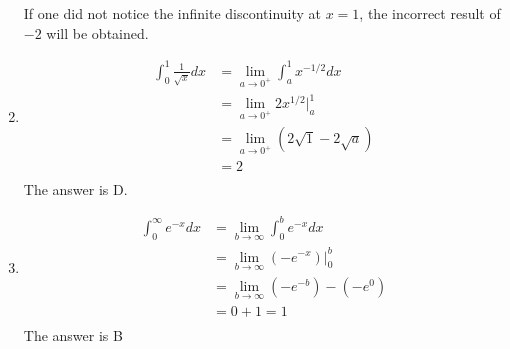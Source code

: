 \documentclass{article}
\begin{document}
\begin{enumerate}
    If one did not notice the infinite discontinuity at $x=1$, the incorrect result of $-2$ will be obtained.

    \item 
    \begin{align*}
        \int_{0}^{1} \frac{1}{\sqrt{x}}dx &= \lim_{a\to 0^+} \int_{a}^{1} x^{-1/2}dx\\
        &= \lim_{a\to 0^+} 2x^{1/2} \Big|_a^1\\
        &= \lim_{a\to 0^+} (2\sqrt{1} - 2\sqrt{a})\\
        &= 2\\
    \end{align*}
    The answer is D.

    \item 
    \begin{align*}
        \int_{0}^{\infty} e^{-x}dx &= \lim_{b\to \infty} \int_{0}^{b} e^{-x}dx\\
        &= \lim_{b\to \infty} \left(-e^{-x}\right) \Big|_0^b\\
        &= \lim_{b\to \infty} \left(-e^{-b}\right) - (-e^0)\\
        &= 0+1 = 1\\
    \end{align*}
    The answer is B
\end{enumerate}
\end{document}
